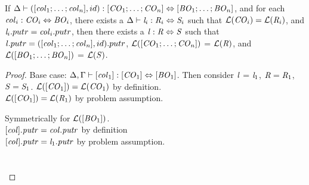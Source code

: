 \begin{lemma}
\label{lem:id-dnf}
If $\Delta \vdash ([\mathit{col}_1 ; \ldots ; \mathit{col}_n],id) : [\mathit{CO}_1 ; \ldots ; \mathit{CO}_n] \Leftrightarrow [\mathit{BO}_1 ; \ldots ; \mathit{BO}_n]$,
and for each $\mathit{col}_i : \mathit{CO}_i \Leftrightarrow \mathit{BO}_i$,
there exists a $\Delta \vdash \mathit{l}_i : \mathit{R}_i \Leftrightarrow \mathit{S}_i$ such that
$\mathcal{L}(\mathit{CO}_i)=\mathcal{L}(\mathit{R}_i)$, and $\mathit{l}_i.putr = \mathit{col}_i.putr$,
then there exists a $\mathit{l} : \mathit{R} \Leftrightarrow \mathit{S}$ such that $\mathit{l}.putr = ([\mathit{col}_1 ; \ldots ; \mathit{col}_n],id).putr$, $\mathcal{L}([\mathit{CO}_1 ; \ldots ; \mathit{CO}_n])$ = $\mathcal{L}(\mathit{R})$,
and $\mathcal{L}([\mathit{BO}_1 ; \ldots ; \mathit{BO}_n])$ = $\mathcal{L}(\mathit{S})$.
\begin{proof}
Base case: $\Delta, \Gamma \vdash [\mathit{col}_1] : [\mathit{CO}_1] \Leftrightarrow [\mathit{BO}_1]$.  Then consider $\mathit{l}$ = $\mathit{l}_1$, $\mathit{R} = \mathit{R}_1$, $\mathit{S} = \mathit{S}_1$.
$\mathcal{L}([\mathit{CO}_1]) = \mathcal{L}(\mathit{CO}_1)$ by definition.\\
$\mathcal{L}([\mathit{CO}_1]) = \mathcal{L}(\mathit{R}_1)$ by problem assumption.

Symmetrically for $\mathcal{L}([\mathit{BO}_1])$.\\
$[\mathit{col}].\mathit{putr} = \mathit{col}.\mathit{putr}$ by definition\\
$[\mathit{col}].\mathit{putr} = \mathit{l}_1.\mathit{putr}$ by problem assumption.
\\\\\\




\end{proof}
\end{lemma}

